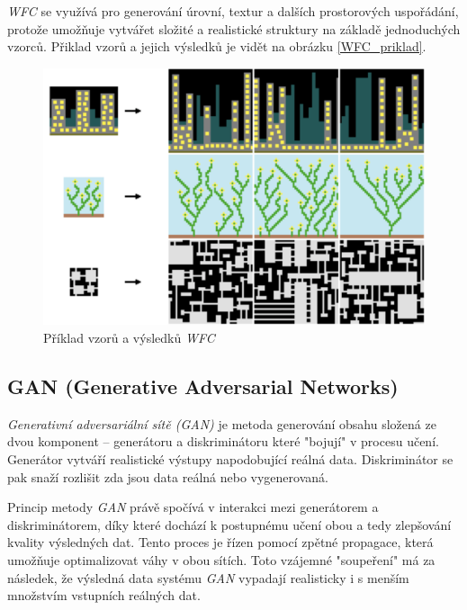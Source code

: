 \textit{WFC} se využívá pro generování úrovní, textur a dalších prostorových uspořádání, protože umožňuje vytvářet složité a realistické struktury na základě jednoduchých vzorců. Přiklad vzorů a jejich výsledků je vidět na obrázku \vref{WFC_priklad}. \cite{waveClanek}

\begin{figure}
  \centering      %
  \includegraphics[scale=0.6]{obr/wfc-examples.png} %
  \caption{Příklad vzorů a výsledků \textit{WFC} \cite{waveClanek}} %
  \label{WFC_priklad} %
\end{figure}

\subsection{GAN (Generative Adversarial Networks)}

\textit{Generativní adversariální sítě (GAN)} je metoda generování obsahu složená ze dvou komponent -- generátoru a diskriminátoru které "bojují" v procesu učení. Generátor vytváří realistické výstupy napodobující reálná data. Diskriminátor se pak snaží rozlišit zda jsou data reálná nebo vygenerovaná.

Princip metody \textit{GAN} právě spočívá v interakci mezi generátorem a diskriminátorem, díky které dochází k postupnému učení obou a tedy zlepšování kvality výsledných dat. Tento proces je řízen pomocí zpětné propagace, která umožňuje optimalizovat váhy v obou sítích. Toto vzájemné "soupeření" má za následek, že výsledná data systému \textit{GAN} vypadají realisticky i s menším množstvím vstupních reálných dat.

